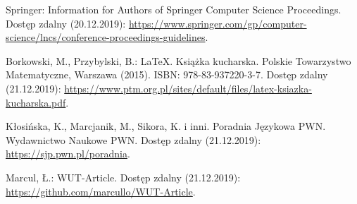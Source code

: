 \begin{thebibliography}{}
Springer: Information for Authors of Springer Computer Science Proceedings. Dostęp zdalny (20.12.2019):
\url{https://www.springer.com/gp/computer-science/lncs/conference-proceedings-guidelines}.

Borkowski, M., Przybylski, B.: \LaTeX. Książka kucharska. Polskie Towarzystwo Matematyczne, Warszawa (2015). ISBN: 978-83-937220-3-7. Dostęp zdalny (21.12.2019):
\url{https://www.ptm.org.pl/sites/default/files/latex-ksiazka-kucharska.pdf}.

Kłosińska, K., Marcjanik, M., Sikora, K. i inni. Poradnia Językowa PWN. Wydawnictwo Naukowe PWN. Dostęp zdalny (21.12.2019):
\url{https://sjp.pwn.pl/poradnia}.

Marcul, Ł.: WUT-Article. Dostęp zdalny (21.12.2019):\\
\url{https://github.com/marcullo/WUT-Article}.
\end{thebibliography}
